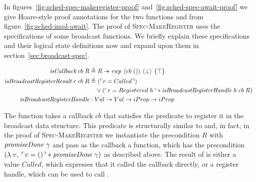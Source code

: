 In figures~\ref{fig:sched-spec-makeregister-proof} and~\ref{fig:sched-spec-await-proof} we give Hoare-style proof annotations for the two functions  and  from figure~\ref{fig:sched-impl-await}.
The proof of \textsc{Spec-MakeRegister} uses the specifications of some broadcast functions.
We briefly explain these specifications and their logical state definitions now and expand upon them in section~\ref{sec:broadcast-spec}.

\begin{align*}
  \gsIsCb{}\; cb\; R                            & \triangleq R \wand \ewp{cb\; ()}{\bot}{\top}                                                           \\
  \emph{isBroadcastRegisterResult}\; r\; cb\; R & \triangleq (\ulcorner r = Called \urcorner)                                                            \\
                                                & \quad \vee (\ulcorner r = Registered\; h \urcorner \ast \emph{isBroadcastRegisterHandle}\; h\; cb\; R) \\
  \emph{isBroadcastRegisterHandle}              & : Val \to Val \to iProp \to iProp
\end{align*}


The function  takes a callback \(cb\) that satisfies the \gsIsCb{} predicate to register it in the broadcast data structure.
This predicate is structurally similar to \gsIsWaker{} and, in fact, in the proof of \textsc{Spec-MakeRegister} we instantiate the precondition \(R\) with \(\emph{promiseDone}~\gamma{}\) and pass as the callback a  function, which has the precondition \((\lambda\; v,\; \ulcorner v = () \urcorner \ast \emph{promiseDone}~\gamma{})\) as described above.
The result of  is either a value \(Called\), which expresses that it called the callback directly, or a register handle, which can be used to call .

